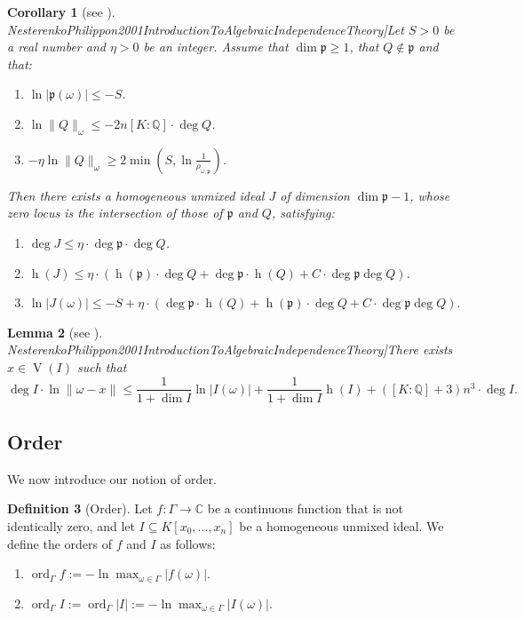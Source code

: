 \documentclass[reqno]{amsart}
\newcommand{\mycite}[2]{\cite[#1]{#2}}
\theoremstyle{plain}
\newtheorem{Cor}{Corollary}
\newtheorem{Lem}[Cor]{Lemma}
\theoremstyle{definition}
\newtheorem{Def}[Cor]{Definition}
\theoremstyle{remark}
\theoremstyle{plain}
\begin{document}
\begin{Cor}[see \mycite{Chapter 3, Corollary 4.12}{NesterenkoPhilippon2001IntroductionToAlgebraicIndependenceTheory}]\label{Corollary Nesterenko corollary intersection of ideal and polynomial}
Let $S>0$ be a real number and $\eta>0$ be an integer. Assume that $\dim\mathfrak p\geq1$, that $Q\not\in\mathfrak p$ and that:
\begin{enumerate}
\item $\ln|\mathfrak p(\omega)|\leq-S$.
\item $\ln\|Q\|_\omega\leq-2n[K:\mathbb Q]\cdot\deg Q$.
\item $-\eta\ln\|Q\|_\omega\geq2\min(S,\ln\frac1{\rho_{\omega,\mathfrak p}})$.
\end{enumerate}

Then there exists a homogeneous unmixed ideal $J$ of dimension $\dim\mathfrak p -1$, whose zero locus is the intersection of those of $\mathfrak p$ and $Q$, satisfying:
\begin{enumerate}
\item $\deg J\leq\eta\cdot\deg\mathfrak p\cdot\deg Q$.
\item $\operatorname{h}(J)\leq\eta\cdot\left(\operatorname{h}(\mathfrak p)\cdot\deg Q+\deg\mathfrak p\cdot\operatorname{h}(Q)+C\cdot\deg\mathfrak p\deg Q\right)$.
\item $
    \ln|J(\omega)|
        \leq
    -S+\eta\cdot\left(\deg\mathfrak p\cdot\operatorname{h}(Q)+\operatorname{h}(\mathfrak p)\cdot\deg Q+C\cdot\deg\mathfrak p\deg Q\right)
.$
\end{enumerate}
\end{Cor}

\begin{Lem}[see \mycite{Chapter 3, Proposition 4.13}{NesterenkoPhilippon2001IntroductionToAlgebraicIndependenceTheory}]\label{Lemma Nesterenko zero of ideal close to omega}
There exists $x\in\operatorname{V}(I)$ such that
\[
    \deg I\cdot\ln\|\omega-x\|\leq\frac1{1+\dim I}\ln|I(\omega)|+\frac1{1+\dim I}\operatorname{h}(I)+([ K:\mathbb Q]+3)n^3\cdot\deg I
.\]
\end{Lem}

\subsection{Order}

We now introduce our notion of order.

\begin{Def}[Order]\label{Definition order}
Let $f:\Gamma\rightarrow\mathbb C$ be a continuous function that is not identically zero, and let $I\subseteq K[x_0,...,x_n]$ be a homogeneous unmixed ideal. We define the orders of $f$ and $I$ as follows:
\begin{enumerate}
    \item $\operatorname{ord}_{\Gamma}f:=-\ln\max_{\omega\in\Gamma}|f(\omega)|$.
    \item $\operatorname*{ord}_{\Gamma}I:=\operatorname*{ord}_{\Gamma}|I|:=-\ln\max_{\omega\in\Gamma}|I(\omega)|$.
\end{enumerate}
\end{Def}
\end{document}
